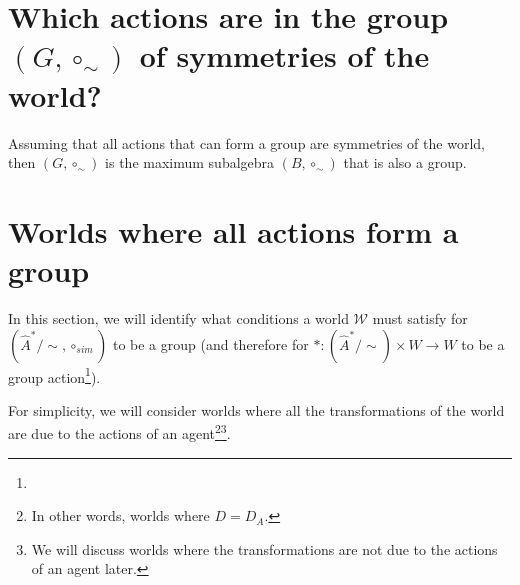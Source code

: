

\section{Which actions are in the group $(G, \circ_{\sim})$ of symmetries of the world?}


Assuming that all actions that can form a group are symmetries of the world, then $(G, \circ_{\sim})$ is the maximum subalgebra $(B, \circ_{\sim})$ that is also a group.

\section{Worlds where all actions form a group}

In this section, we will identify what conditions a world $\mathscr{W}$ must satisfy for $(\hat{A}^{*}/\sim, \circ_{sim})$ to be a group (and therefore for $\ast: (\hat{A}^{*}/\sim) \times W \to W$ to be a group action\footnote{
}).

For simplicity, we will consider worlds where all the transformations of the world are due to the actions of an agent\footnote{In other words, worlds where $D = D_{A}$.}\footnote{We will discuss worlds where the transformations are not due to the actions of an agent later.}.






